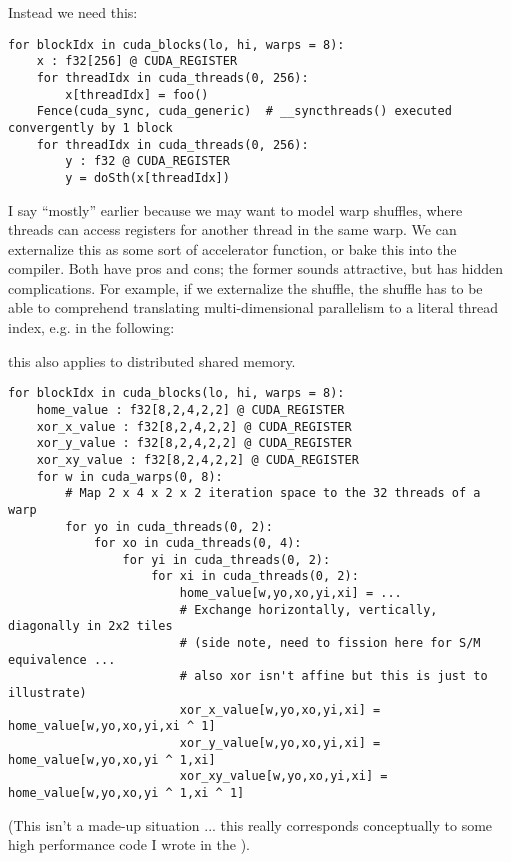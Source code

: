 \filbreak
Instead we need this:
{\color{lightttColor}
\begin{verbatim}
for blockIdx in cuda_blocks(lo, hi, warps = 8):
    x : f32[256] @ CUDA_REGISTER
    for threadIdx in cuda_threads(0, 256):
        x[threadIdx] = foo()
    Fence(cuda_sync, cuda_generic)  # __syncthreads() executed convergently by 1 block
    for threadIdx in cuda_threads(0, 256):
        y : f32 @ CUDA_REGISTER
        y = doSth(x[threadIdx])
\end{verbatim}
}

I say ``mostly'' earlier because we may want to model warp shuffles, where threads can access registers for another thread in the same warp.
We can externalize this as some sort of accelerator function, or bake this into the compiler.
Both have pros and cons; the former sounds attractive, but has hidden complications.
For example, if we externalize the shuffle, the shuffle has to be able to comprehend translating multi-dimensional parallelism to a literal thread index, e.g. in the following:

 this also applies to distributed shared memory.

\filbreak
{\color{lightttColor}
\begin{verbatim}
for blockIdx in cuda_blocks(lo, hi, warps = 8):
    home_value : f32[8,2,4,2,2] @ CUDA_REGISTER
    xor_x_value : f32[8,2,4,2,2] @ CUDA_REGISTER
    xor_y_value : f32[8,2,4,2,2] @ CUDA_REGISTER
    xor_xy_value : f32[8,2,4,2,2] @ CUDA_REGISTER
    for w in cuda_warps(0, 8):
        # Map 2 x 4 x 2 x 2 iteration space to the 32 threads of a warp
        for yo in cuda_threads(0, 2):
            for xo in cuda_threads(0, 4):
                for yi in cuda_threads(0, 2):
                    for xi in cuda_threads(0, 2):
                        home_value[w,yo,xo,yi,xi] = ...
                        # Exchange horizontally, vertically, diagonally in 2x2 tiles
                        # (side note, need to fission here for S/M equivalence ...
                        # also xor isn't affine but this is just to illustrate)
                        xor_x_value[w,yo,xo,yi,xi] = home_value[w,yo,xo,yi,xi ^ 1]
                        xor_y_value[w,yo,xo,yi,xi] = home_value[w,yo,xo,yi ^ 1,xi]
                        xor_xy_value[w,yo,xo,yi,xi] = home_value[w,yo,xo,yi ^ 1,xi ^ 1]
\end{verbatim}
}
(This isn't a made-up situation ... this really corresponds conceptually to some high performance code I wrote in the ).

